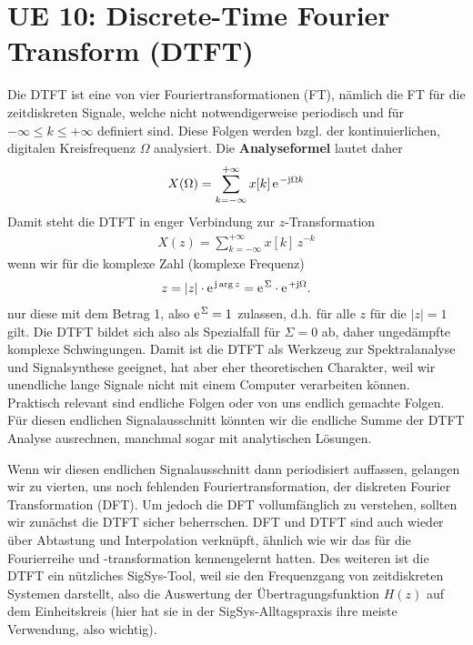 \clearpage
\section{UE 10: Discrete-Time Fourier Transform (DTFT)}
\label{sec:ue10_dtft}

Die DTFT ist eine von vier Fouriertransformationen (FT), nämlich die FT für
die zeitdiskreten Signale, welche nicht notwendigerweise periodisch
und für $-\infty \leq k \leq +\infty$ definiert sind.
Diese Folgen werden bzgl. der kontinuierlichen, digitalen Kreisfrequenz $\Omega$
analysiert.
%
Die \textbf{Analyseformel} lautet daher
\begin{align}
X(\Omega) = \sum\limits_{k=-\infty}^{+\infty} x[k] \, \e^{-\im\Omega k}
\end{align}
%
Damit steht die DTFT in enger Verbindung zur $z$-Transformation
\begin{align}
X(z) = \sum\limits_{k=-\infty}^{+\infty} x[k] \, z^{-k}
\end{align}
wenn wir für die komplexe Zahl (komplexe Frequenz)
\begin{align}
z = |z| \cdot \e^{\im \arg z} = \e^{\Sigma} \cdot \e^{+\im \Omega}.
\end{align}
nur diese mit dem Betrag 1, also $\e^{\Sigma}=1$ zulassen, d.h.
für alle $z$ für die $|z|=1$ gilt.
%
%
Die DTFT bildet sich also als Spezialfall für $\Sigma=0$ ab, daher ungedämpfte
komplexe Schwingungen.
%
Damit ist die DTFT als Werkzeug zur Spektralanalyse und Signalsynthese geeignet,
hat aber eher theoretischen Charakter, weil wir unendliche lange Signale
nicht mit einem Computer verarbeiten können.
%
Praktisch relevant sind endliche Folgen oder von uns endlich gemachte Folgen.
%
Für diesen endlichen Signalausschnitt könnten wir die endliche Summe der DTFT Analyse
ausrechnen, manchmal sogar mit analytischen Lösungen.
%

Wenn wir diesen endlichen Signalausschnitt dann periodisiert auffassen,
gelangen wir zu vierten, uns noch fehlenden Fouriertransformation, der diskreten
Fourier Transformation (DFT).
%
Um jedoch die DFT vollumfänglich zu verstehen, sollten wir zunächst die DTFT
sicher beherrschen.
%
DFT und DTFT sind auch wieder über Abtastung und Interpolation
verknüpft, ähnlich wie wir das für die Fourierreihe und -transformation
kennengelernt hatten.
%
Des weiteren ist die DTFT ein nützliches SigSys-Tool, weil
sie den Frequenzgang von zeitdiskreten Systemen darstellt, also die Auswertung
der Übertragungsfunktion $H(z)$ auf dem Einheitskreis (hier hat sie in der
SigSys-Alltagspraxis ihre meiste Verwendung, also wichtig).

